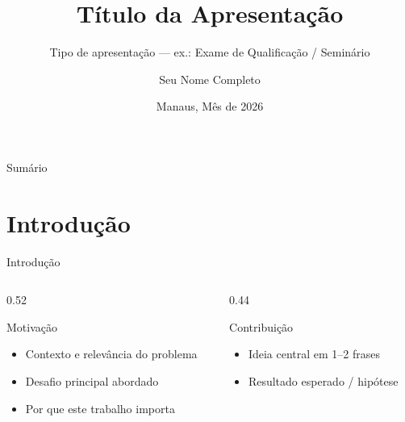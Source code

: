 \documentclass[aspectratio=169, 11pt, brazil]{beamer}
\title{Título da Apresentação}
\subtitle{Tipo de apresentação — ex.: Exame de Qualificação / Seminário}
\author[S.\ Nome]{Seu Nome Completo}
\institute[IComp · UFAM]{%
  Instituto de Computação — IComp\\
  Universidade Federal do Amazonas — UFAM
}
\date{Manaus, Mês de 2026}
\begin{document}

\begin{frame}
  \titlepage
\end{frame}

\begin{frame}{Sumário}
  \tableofcontents
\end{frame}

\section{Introdução}

\begin{frame}{Introdução}
  \begin{columns}[T,onlytextwidth]
    \begin{column}{0.52\textwidth}
      \begin{block}{Motivação}
        \begin{itemize}
          \item Contexto e relevância do problema
          \item Desafio principal abordado
          \item Por que este trabalho importa
        \end{itemize}
      \end{block}
    \end{column}
    \begin{column}{0.44\textwidth}
      \begin{destaque}{Contribuição}
        \begin{itemize}
          \item Ideia central em 1--2 frases
          \item Resultado esperado / hipótese
        \end{itemize}
      \end{destaque}
    \end{column}
  \end{columns}
\end{frame}
\end{document}
